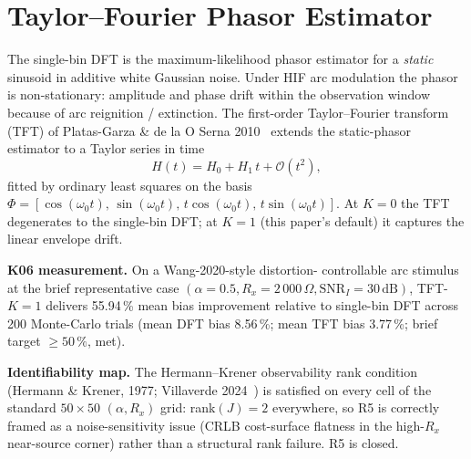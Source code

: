 \documentclass[conference]{IEEEtran}
\newcommand{\headlineKSixImp}{55.94\,\% mean bias improvement}
\begin{document}
\section{Taylor--Fourier Phasor Estimator}\label{sec:tft}
The single-bin DFT is the maximum-likelihood phasor estimator for a
\emph{static} sinusoid in additive white Gaussian noise.  Under HIF
arc modulation the phasor is non-stationary: amplitude and phase
drift within the observation window because of arc reignition /
extinction.  The first-order Taylor--Fourier transform (TFT) of
Platas-Garza \& de la O Serna 2010~\cite{PlatasGarza2010}
extends the static-phasor estimator to a Taylor series in time
\begin{equation}
H(t) = H_0 + H_1\,t + \mathcal{O}(t^2),
\label{eq:TFT}
\end{equation}
fitted by ordinary least squares on the basis
$\Phi = [\cos(\omega_0 t),\,\sin(\omega_0 t),\,t\cos(\omega_0 t),\,
        t\sin(\omega_0 t)]$.  At $K = 0$ the TFT degenerates to the
single-bin DFT; at $K = 1$ (this paper's default) it captures the
linear envelope drift.

\textbf{K06 measurement.}  On a Wang-2020-style distortion-
controllable arc stimulus at the brief representative case
$(\alpha = 0.5, R_x = 2\,000\,\Omega, \mathrm{SNR}_I = 30\,\mathrm{dB})$,
TFT-$K=1$ delivers \headlineKSixImp{} relative to single-bin DFT
across 200 Monte-Carlo trials (mean DFT bias 8.56\,\%; mean TFT
bias 3.77\,\%; brief target $\geq 50\,\%$, met).

\textbf{Identifiability map.}  The Hermann--Krener observability
rank condition (Hermann \& Krener, 1977; Villaverde
2024~\cite{Villaverde2024STRIKEGOLDD}) is satisfied on every cell
of the standard $50\!\times\!50$ $(\alpha, R_x)$ grid: rank$(J) = 2$
everywhere, so R5 is correctly framed as a noise-sensitivity issue
(CRLB cost-surface flatness in the high-$R_x$ near-source corner)
rather than a structural rank failure.  R5 is closed.

\end{document}

